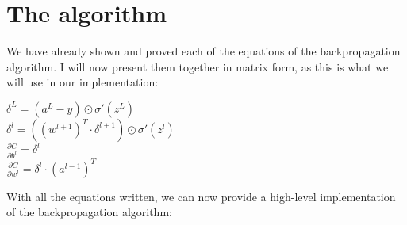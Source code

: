 \documentclass[../main]{subfiles}
\begin{document}
\section{The algorithm}
We have already shown and proved each of the equations of the backpropagation algorithm. I will now present them together in matrix form, as this is what we will use in our implementation:\vspace{6mm}
\begin{mdframed}[style=myequationstyle]
\begin{center}
    $\delta^L = (a^L-y)\odot\sigma'(z^L)$\\ \vspace{3mm}
    $\delta^l = \left((w^{l+1})^T \cdot \delta^{l+1}\right) \odot \sigma'(z^l)$\\ \vspace{3mm}
    $\frac{\partial C}{\partial b^l} = \delta^l$\\ \vspace{3mm}
    $\frac{\partial C}{\partial w^l} = \delta^l \cdot (a^{l-1})^T $
\end{center}
\end{mdframed}\vspace{4mm}
With all the equations written, we can now provide a high-level implementation of the backpropagation algorithm:
\end{document}
